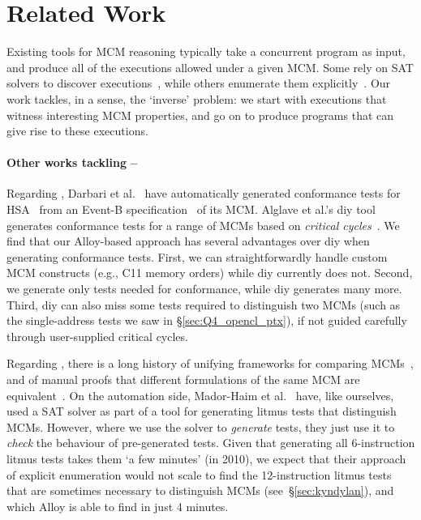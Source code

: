 \section{Related Work}
\label{sec:related}

Existing tools for MCM reasoning typically take a concurrent program
as input, and produce all of the executions allowed under a given MCM.
Some rely on SAT solvers to discover executions~\cite{torlak+10,
blanchette+11, yang+04, demsky+15}, while others enumerate them
explicitly~\cite{sarkar+09, norris+13, alglave+13, alglave+14,
batty+11, sarkar+11}.
%
Our work tackles, in a sense, the `inverse' problem: we start with
executions that witness interesting MCM properties, and go on to
produce programs that can give rise to these executions.

\paragraph{Other works tackling --}

Regarding , Darbari et al.~\cite{darbari+16} have automatically
generated conformance tests for HSA~\cite{hsa-foundation15} from an
Event-B specification~\cite{abrial+10} of its MCM. Alglave et al.'s
\textsf{diy} tool~\cite{alglave+10} generates conformance tests for a
range of MCMs based on \emph{critical cycles}~\cite{shasha+88}. We
find that our Alloy-based approach has several advantages over
\textsf{diy} when generating conformance tests. First, we can
straightforwardly handle custom MCM constructs (e.g., C11 memory
orders) while \textsf{diy} currently does not. Second, we generate
only tests needed for conformance, while \textsf{diy} generates
many more. Third, \textsf{diy} can also miss some tests required to
distinguish two MCMs (such as the single-address tests we saw in
\S\ref{sec:Q4_opencl_ptx}), if not guided carefully through
user-supplied critical cycles.

Regarding , there is a long history of unifying frameworks for
comparing MCMs~\cite{adve93, gharachorloo95, higham+97, higham+07,
shasha+88, collier92}, and of manual proofs that different
formulations of the same MCM are equivalent~\cite{owens+09,
mador-haim+12}. On the automation side, Mador-Haim et
al.~\cite{mador-haim+10} have, like ourselves, used a SAT solver as
part of a tool for generating litmus tests that distinguish MCMs.
However, where we use the solver to \emph{generate} tests, they just
use it to \emph{check} the behaviour of pre-generated tests. Given
that generating all 6-instruction litmus tests takes them `a few
minutes' (in 2010), we expect that their approach of explicit
enumeration would not scale to find the 12-instruction litmus tests
that are sometimes necessary to distinguish MCMs
(see~\S\ref{sec:kyndylan}), and which Alloy is able to find in just
4 minutes.

